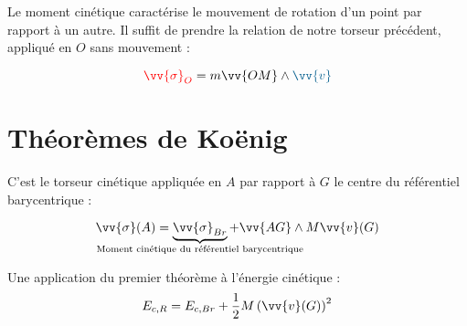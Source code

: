 \documentclass[11pt,a4paper,fleqn,pdftex]{report}
\begin{document}
\begin{dfn}
Le moment cinétique caractérise le mouvement de rotation d'un point par rapport à un autre. Il suffit de prendre la relation de notre torseur précédent, appliqué en $O$ sans mouvement :\\
\begin{minipage}{5cm}%
\begin{equation}\label{Moment Cinetique}
\textcolor{couleurImp}{\vv{\sigma}_O}=m\vv{OM}\wedge\textcolor{MidnightBlue}{\vv{v}}
\end{equation}
\end{minipage}
\begin{minipage}{5cm}%
\end{minipage}
\end{dfn}
%
\section{Théorèmes de Koënig}
\begin{itheorem}
C'est le torseur cinétique appliquée en $A$ par rapport à $G$ le centre du  référentiel barycentrique : \\
\begin{center}
\begin{equation}
\vv{\sigma}(A)=\underbrace{\vv{\sigma}_{Br}}_{\mathclap{\text{Moment cinétique du référentiel barycentrique}}}+\vv{AG}\wedge{}M\vv{v}(G)
\end{equation}
\end{center}
\end{itheorem}
\begin{theorem}
Une application du premier théorème à l'énergie cinétique :\\
\begin{equation}
E_{c,R}=E_{c,Br}+\frac{1}{2}M\left(\vv{v}(G)\right)^2
\end{equation}
\end{theorem}
\end{document}
